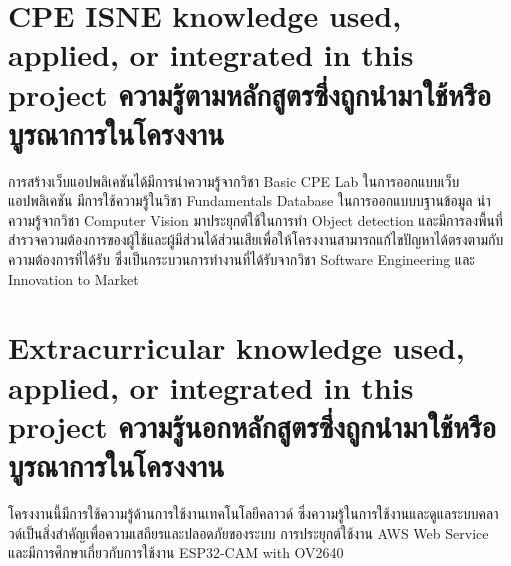 


\section{\ifenglish%
\ifcpe CPE \else ISNE \fi knowledge used, applied, or integrated in this project
\else%
ความรู้ตามหลักสูตรซึ่งถูกนำมาใช้หรือบูรณาการในโครงงาน
\fi
}
การสร้างเว็บแอปพลิเคชันได้มีการนำความรู้จากวิชา Basic CPE Lab ในการออกแบบเว็บแอปพลิเคชัน มีการใช้ความรู้ในวิชา Fundamentals Database
ในการออกแบบบฐานข้อมูล นำความรู้จากวิชา Computer Vision มาประยุกต์ใช้ในการทำ Object detection 
และมีการลงพื้นที่สำรวจความต้องการของผู้ใช้และผู้มีส่วนได้ส่วนเสียเพื่อให้โครงงานสามารถแก้ไขปัญหาได้ตรงตามกับความต้องการที่ได้รับ 
ซึ่งเป็นกระบวนการทำงานที่ได้รับจากวิชา Software Engineering และ Innovation to Market

\section{\ifenglish%
Extracurricular knowledge used, applied, or integrated in this project
\else%
ความรู้นอกหลักสูตรซึ่งถูกนำมาใช้หรือบูรณาการในโครงงาน
\fi
}
โครงงานนี้มีการใช้ความรู้ด้านการใช้งานเทคโนโลยีคลาวด์ ซึ่งความรู้ในการใช้งานและดูแลระบบคลาวด์เป็นสิ่งสำคัญเพื่อความเสถียรและปลอดภัยของระบบ การประยุกต์ใช้งาน AWS Web Service และมีการศึกษาเกี่ยวกับการใช้งาน ESP32-CAM with OV2640
